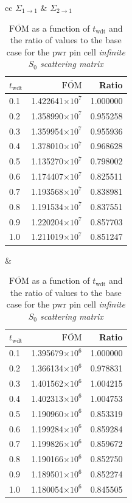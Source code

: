 \begin{table}[hbtp]
  \centering
  \caption[$\overline{\mathrm{FOM}}$ and ratio for
  the \acrshort{pwr} pin cell \textit{infinite $S_0$ scattering matrix}.]{$\overline{\mathrm{FOM}}$ as a function of
    $t_{\mathrm{wdt}}$ and the ratio of values to the base case for
    the \gls{pwr} pin cell \textit{infinite $S_0$ scattering matrix}}

  \begin{tabular}{cc} $\Sigma_{1\to 1}$ & $\Sigma_{2 \to 1}$ \\
\begin{tabular}{lrr}
\toprule
$t_{\mathrm{wdt}}$ &                   $\overline{\mathrm{FOM}}$ & Ratio\\
\midrule
 0.1 & 1.422641$\times 10^{7}$ & 1.000000 \\
 0.2 & 1.358990$\times 10^{7}$ & 0.955258 \\
 0.3 & 1.359954$\times 10^{7}$ & 0.955936 \\
 0.4 & 1.378010$\times 10^{7}$ & 0.968628 \\
 0.5 & 1.135270$\times 10^{7}$ & 0.798002 \\
 0.6 & 1.174407$\times 10^{7}$ & 0.825511 \\
 0.7 & 1.193568$\times 10^{7}$ & 0.838981 \\
 0.8 & 1.191534$\times 10^{7}$ & 0.837551 \\
 0.9 & 1.220204$\times 10^{7}$ & 0.857703 \\
 1.0 & 1.211019$\times 10^{7}$ & 0.851247 \\
\bottomrule
\end{tabular} &
\begin{tabular}{lrr}
\toprule
$t_{\mathrm{wdt}}$ &                   $\overline{\mathrm{FOM}}$ &
                                                                   Ratio\\
\midrule
 0.1 & 1.395679$\times 10^{6}$ & 1.000000 \\
 0.2 & 1.366134$\times 10^{6}$ & 0.978831 \\
 0.3 & 1.401562$\times 10^{6}$ & 1.004215 \\
 0.4 & 1.402313$\times 10^{6}$ & 1.004753 \\
 0.5 & 1.190960$\times 10^{6}$ & 0.853319 \\
 0.6 & 1.199284$\times 10^{6}$ & 0.859284 \\
 0.7 & 1.199826$\times 10^{6}$ & 0.859672 \\
 0.8 & 1.190166$\times 10^{6}$ & 0.852750 \\
 0.9 & 1.189501$\times 10^{6}$ & 0.852274 \\
 1.0 & 1.180054$\times 10^{6}$ & 0.845505 \\
\bottomrule
\end{tabular} \\


\end{tabular}
\end{table}
